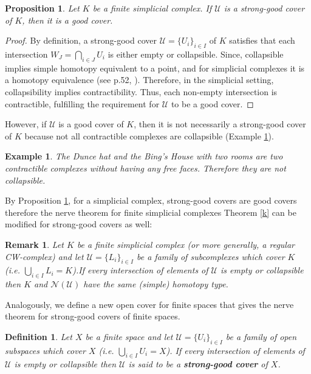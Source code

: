 \documentclass[12pt,a4paper,twoside, reqno, tbtags]{article}
\numberwithin{equation}{section}
\newtheorem{definition}{Definition}[section]
\newtheorem{proposition}{Proposition}[section]
\newtheorem{example}{Example}[section]
\newtheorem{remark}{Remark}[section]
\begin{document}
\begin{proposition}\label{12}
 Let $K$ be a finite simplicial complex. If $\mathcal{U}$ is a strong-good cover of $K$, then it is a good cover.   
\end{proposition}
\begin{proof}
 By definition, a strong-good cover $\mathcal{U} = \{U_i\}_{i \in I}$ of $K$ satisfies that each intersection $W_J = \bigcap_{i \in J} U_i$ is either empty or collapsible. Since, collapsible implies simple homotopy equivalent to a point, and for simplicial complexes it is a homotopy equivalence (see p.52, \cite{Barmak}). Therefore, in the simplicial setting, collapsibility implies contractibility.  Thus, each non-empty intersection is contractible, fulfilling the requirement for $\mathcal{U}$ to be a good cover.    
\end{proof}
\noindent However, if $\mathcal{U}$ is a good cover of $K$, then it is not necessarily a strong-good cover of $K$ because not all contractible complexes are collapsible (Example \ref{12a}).

\begin{example}\label{12a}
    The Dunce hat and the Bing's House with two rooms are two contractible complexes without having any free faces. Therefore they are not collapsible.
\end{example}
    \noindent By Proposition \ref{12}, for a simplicial complex, strong-good covers are good covers therefore the nerve theorem for finite simplicial complexes Theorem \ref{k} can be modified for strong-good covers as well:
\begin{remark}\label{13}
    Let $K$ be a finite simplicial complex (or more generally, a regular CW-complex) and let $\mathcal{U} =\{L_i \}_{i\in I}$ be a family of subcomplexes which cover $K$ (i.e. $\bigcup_{i\in I} L_i = K$).If every intersection of elements of $\mathcal{U}$ is empty or collapsible then $K$ and $\mathcal{N}(\mathcal{U})$ have the same (simple) homotopy type.
 \end{remark}
    \noindent Analogously, we define a new open cover for finite spaces that gives the nerve theorem for strong-good covers of finite spaces.
\begin{definition}\label{14}
    Let $X$ be a finite space and let $\mathcal{U} =\{U_i \}_{i\in I}$ be a family of open subspaces which cover $X$ (i.e. $\bigcup_{i\in I} U_i = X$). If every intersection of elements of $\mathcal{U}$ is empty or collapsible then $\mathcal{U}$ is said to be a \textbf{strong-good cover} of $X$.
\end{definition}
\end{document}
